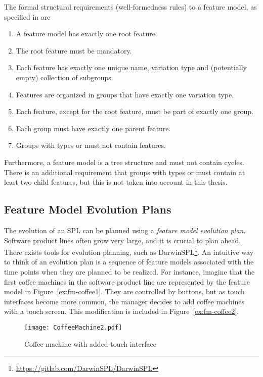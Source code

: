 The formal structural requirements (well-formedness rules) to a feature model, as specified in \cite{art:consistency-preserving-evolution-planning} are 
\begin{enumerate}[\itbf{WF\arabic*}, itemsep=0mm]
   \item A feature model has exactly one root feature.
   \item The root feature must be mandatory.
   \item Each feature has exactly one unique name, variation type and (potentially empty) collection of subgroups.
   \item Features are organized in groups that have exactly one variation type.
   \item Each feature, except for the root feature, must be part of exactly one group.
   \item Each group must have exactly one parent feature.
   \item Groups with types \xortype{} or \ortype{} must not contain \mandatory{} features.
\end{enumerate}

Furthermore, a feature model is a tree structure and must not contain cycles. There is an additional requirement that groups with types \xortype{} or \ortype{} must contain at least two child features, but this is not taken into account in this thesis.

\subsection{Feature Model Evolution Plans}
\label{sub:feature-model-evolution-plans}
The evolution of an SPL can be planned using a \emph{feature model evolution plan}. Software product lines often grow very large, and it is crucial to plan ahead. 
There exists tools for evolution planning, such as DarwinSPL\footnote{\url{https://gitlab.com/DarwinSPL/DarwinSPL}}. An intuitive way to think of an evolution plan is a sequence of feature models associated with the time points when they are planned to be realized. For instance, imagine that the first coffee machines in the software product line are represented by the feature model in Figure~\vref{ex:fm-coffee1}. They are controlled by buttons, but as touch interfaces become more common, the manager decides to add coffee machines with a touch screen. This modification is included in Figure~\vref{ex:fm-coffee2}.


\begin{figure}
   \begin{center}
      \texttt{[image: CoffeeMachine2.pdf]}
   \end{center}
   \caption[Coffee machine with added touch interface]{Coffee machine with added touch interface \footnotemark}
   \label{ex:fm-coffee2}
\end{figure}

